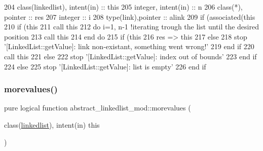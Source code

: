 \begin{DoxyCode}
204     \textcolor{keywordtype}{class}(linkedlist), \textcolor{keywordtype}{intent(in)} :: this
205     \textcolor{keywordtype}{integer}, \textcolor{keywordtype}{intent(in)} :: n
206     \textcolor{keywordtype}{class}(*), \textcolor{keywordtype}{pointer} :: res
207     \textcolor{keywordtype}{integer} :: i
208     \textcolor{keywordtype}{type}(link),\textcolor{keywordtype}{pointer} :: alink
209     \textcolor{keywordflow}{if} (\textcolor{keyword}{associated}(this%
210         \textcolor{keywordflow}{if} (this%
211             \textcolor{keyword}{call }this%
212             \textcolor{keywordflow}{do} i=1, n-1    \textcolor{comment}{!iterating trough the list until the desired position            }
213                 \textcolor{keyword}{call }this%
214 \textcolor{keywordflow}{            end do}
215             \textcolor{keywordflow}{if} (this%
216             res => this%
217             \textcolor{keywordflow}{else}
218                 stop \textcolor{stringliteral}{'[LinkedList::getValue]: link non-existant, something went wrong!'}
219 \textcolor{keywordflow}{            end if}
220             \textcolor{keyword}{call }this%
221         \textcolor{keywordflow}{else}
222             stop \textcolor{stringliteral}{'[LinkedList::getValue]: index out of bounds'}
223 \textcolor{keywordflow}{        end if}
224     \textcolor{keywordflow}{else}
225         stop \textcolor{stringliteral}{'[LinkedList::getValue]: list is empty'}
226 \textcolor{keywordflow}{    end if}
\end{DoxyCode}
\mbox{\label{namespaceabstract__linkedlist__mod_a91ec7f6e570a87769ebb3d11b33f577e}} 
\subsubsection{\texorpdfstring{morevalues()}{morevalues()}}
{\footnotesize\ttfamily pure logical function abstract\+\_\+linkedlist\+\_\+mod\+::morevalues (\begin{DoxyParamCaption}\item[{class(\mbox{\hyperlink{structabstract__linkedlist__mod_1_1linkedlist}{linkedlist}}), intent(in)}]{this }\end{DoxyParamCaption})\hspace{0.3cm}{\ttfamily [private]}}




